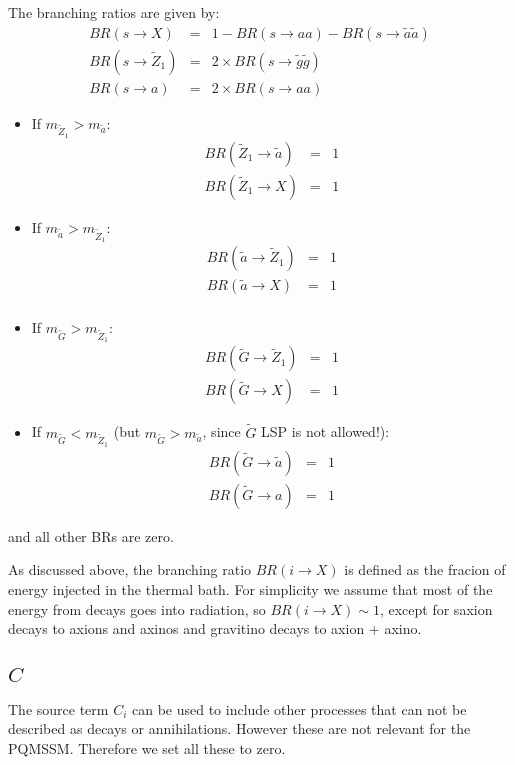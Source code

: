 \documentclass[preprint,notoc]{JHEP3}
\def\to{\rightarrow}
\def\bi{\begin{itemize}}
\def\ei{\end{itemize}}
\def\ta{\tilde a}
\def\tG{\widetilde G}
\def\ta{\tilde a}
\def\tg{\tilde g}
\def\tz{\widetilde Z}
\def\to{\rightarrow}
\begin{document}
The branching ratios are given by:
\begin{eqnarray*}
BR(s \to X) & = &  1 - BR(s \to aa) - BR(s \to \ta\ta)\\
BR(s \to \tilde{Z}_1) & = & 2\times BR(s \to \tg\tg) \\
BR(s \to a) & = & 2\times BR(s \to aa)
\end{eqnarray*}
\bi
\item If $m_{\tz_1} > m_{\ta}$:
\begin{eqnarray*}
BR(\tz_1 \to \ta) & = &  1 \\
BR(\tz_1 \to X) & = &  1
\end{eqnarray*}
\item If $m_{\ta} > m_{\tz_1}$:
\begin{eqnarray*}
BR(\ta \to \tz_1) & = &  1 \\
BR(\ta \to X) & = &  1 \\
\end{eqnarray*}
\ei
\bi
\item If $m_{\tG} > m_{\tz_1}$:
\begin{eqnarray*}
BR(\tG \to \tz_1) & = &  1 \\
BR(\tG \to X) & = &  1
\end{eqnarray*}
\item If $m_{\tG} < m_{\tz_1}$ (but $m_{\tG} > m_{\ta}$, since $\tG$ LSP is not allowed!):
\begin{eqnarray*}
BR(\tG \to \ta) & = &  1 \\
BR(\tG \to a) & = &  1 
\end{eqnarray*}
\ei
and all other BRs are zero.

As discussed above, the branching ratio $BR(i \to X)$ is defined as the fracion of energy injected in the
thermal bath. For simplicity we assume that most of the energy from decays goes into radiation, so $BR(i \to X) \sim 1$,
except for saxion decays to axions and axinos and gravitino decays to axion + axino.

\subsection{$C$}
The source term $C_i$ can be used to include other processes that can not be described as decays or annihilations.
However these are not relevant for the PQMSSM. Therefore we set all these to zero.
\end{document}
